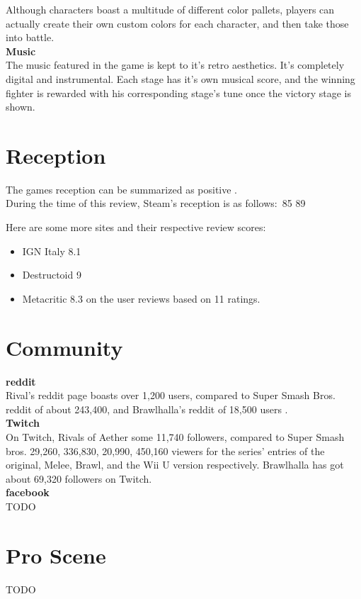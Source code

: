 \documentclass{article}
\begin{document}
Although characters boast a multitude of different color pallets, players can actually create their own custom colors for each character, and then take those into battle.\\

\textbf{Music}\\
The music featured in the game is kept to it's retro aesthetics. It's completely digital and instrumental. Each stage has it's own musical score, and the winning fighter is rewarded with his corresponding stage's tune once the victory stage is shown.\\


\chapter{Reception}


The games reception can be summarized as positive \cite{steam:6}.\\
During the time of this review, Steam's reception is as follows:\
85%
89%


Here are some more sites and their respective review scores: \cite{metacritic:7} %

\begin{itemize}
\item IGN Italy 8.1
\item Destructoid 9
\item Metacritic 8.3 on the user reviews based on 11 ratings.
\end{itemize}

\chapter{Community}

\textbf{reddit}\\
Rival's reddit page boasts over 1,200 users, compared to Super Smash Bros. reddit of about 243,400, and Brawlhalla's reddit of 18,500 users \cite{reddit:4}.\\

\textbf{Twitch}\\
On Twitch, Rivals of Aether some 11,740 followers, compared to Super Smash bros. 29,260, 336,830, 20,990, 450,160 viewers for the series' entries of the original, Melee, Brawl, and the Wii U version respectively. Brawlhalla has got about 69,320 followers on Twitch. \cite{twitch:5}\\

\textbf{facebook}\\

TODO\\

\chapter{Pro Scene}

TODO\\

\newpage

 
\end{document}
